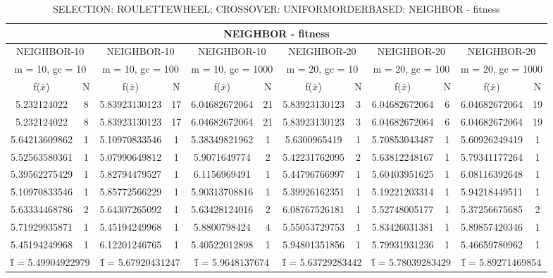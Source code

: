 \begin{table}[H]
	\centering
	\caption{SELECTION: ROULETTEWHEEL; CROSSOVER: UNIFORMORDERBASED: NEIGHBOR - fitness}
	\begin{adjustbox}{width=1\textwidth}
		\begin{tabular}{ |c|c||c|c||c|c||c|c||c|c||c|c| }
			\hline
			\multicolumn{12}{|c|}{NEIGHBOR - fitness} \\
			\hline
			\multicolumn{2}{|c||}{NEIGHBOR-10} & \multicolumn{2}{c||}{NEIGHBOR-10} & \multicolumn{2}{c||}{NEIGHBOR-10} & \multicolumn{2}{c||}{NEIGHBOR-20} & \multicolumn{2}{c||}{NEIGHBOR-20} & \multicolumn{2}{c|}{NEIGHBOR-20}\\
			\hline
			\multicolumn{2}{|c||}{m = 10, gc = 10} & \multicolumn{2}{c||}{m = 10, gc = 100} & \multicolumn{2}{c||}{m = 10, gc = 1000} & \multicolumn{2}{c||}{m = 20, gc = 10} & \multicolumn{2}{c||}{m = 20, gc = 100} & \multicolumn{2}{c|}{m = 20, gc = 1000}\\
			\hline
			f($\bar{x}$) & N & f($\bar{x}$) & N & f($\bar{x}$) & N & f($\bar{x}$) & N & f($\bar{x}$) & N & f($\bar{x}$) & N\\
			\hline
			\hline
			5.232124022 & 8 & 5.83923130123 & 17 & 6.04682672064 & 21 & 5.83923130123 & 3 & 6.04682672064 & 6 & 6.04682672064 & 19\\
			\hline
			5.232124022 & 8 & 5.83923130123 & 17 & 6.04682672064 & 21 & 5.83923130123 & 3 & 6.04682672064 & 6 & 6.04682672064 & 19\\
			5.64213609862 & 1 & 5.10970833546 & 1 & 5.38349821962 & 1 & 5.6300965419 & 1 & 5.70853043487 & 1 & 5.60926249419 & 1\\
			5.52563580361 & 1 & 5.07990649812 & 1 & 5.9071649774 & 2 & 5.42231762095 & 2 & 5.63812248167 & 1 & 5.79341177264 & 1\\
			5.39562275429 & 1 & 5.82794479527 & 1 & 6.1156969491 & 1 & 5.44796766997 & 1 & 5.60403951625 & 1 & 6.08116392648 & 1\\
			5.10970833546 & 1 & 5.85772566229 & 1 & 5.90313708816 & 1 & 5.39926162351 & 1 & 5.19221203314 & 1 & 5.94218449511 & 1\\
			5.63334468786 & 2 & 5.64307265092 & 1 & 5.63428124016 & 2 & 6.08767526181 & 1 & 5.52748005177 & 1 & 5.37256675685 & 2\\
			5.71929935871 & 1 & 5.45194249968 & 1 & 5.8800798424 & 4 & 5.55053729753 & 1 & 5.83426031381 & 1 & 5.89857420346 & 1\\
			5.45194249968 & 1 & 6.12201246765 & 1 & 5.40522012898 & 1 & 5.94801351856 & 1 & 5.79931931236 & 1 & 5.46659780962 & 1\\
			\hline
			\multicolumn{2}{|c||}{\^{f} = 5.49904922979} & \multicolumn{2}{c||}{\^{f} = 5.67920431247} & \multicolumn{2}{c||}{\^{f} = 5.9648137674} & \multicolumn{2}{c||}{\^{f} = 5.63729283442} & \multicolumn{2}{c||}{\^{f} = 5.78039283429} & \multicolumn{2}{c|}{\^{f} = 5.89271469854}\\
			\hline
		\end{tabular}
	\end{adjustbox}
\end{table}
